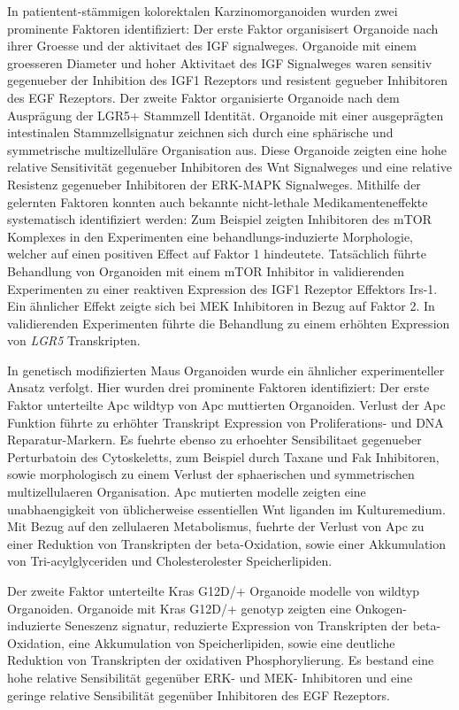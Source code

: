 In patientent-stämmigen kolorektalen Karzinomorganoiden wurden zwei prominente Faktoren identifiziert: Der erste Faktor organisisert Organoide nach ihrer Groesse und der aktivitaet des IGF signalweges. Organoide mit einem groesseren Diameter und hoher Aktivitaet des IGF Signalweges waren sensitiv gegenueber der Inhibition des IGF1 Rezeptors und resistent gegueber Inhibitoren des EGF Rezeptors. 
\smallbreak
Der zweite Faktor organisierte Organoide nach dem Ausprägung der LGR5+ Stammzell Identität. Organoide mit einer ausgeprägten intestinalen Stammzellsignatur zeichnen sich durch eine sphärische und symmetrische multizelluläre Organisation aus. Diese Organoide zeigten eine hohe relative Sensitivität gegenueber Inhibitoren des Wnt Signalweges und eine relative Resistenz gegenueber Inhibitoren der ERK-MAPK Signalweges. 
\smallbreak
Mithilfe der gelernten Faktoren konnten auch bekannte nicht-lethale Medikamenteneffekte systematisch identifiziert werden: Zum Beispiel zeigten Inhibitoren des mTOR Komplexes in den Experimenten eine behandlungs-induzierte Morphologie, welcher auf einen positiven Effect auf Faktor 1 hindeutete. Tatsächlich führte Behandlung von Organoiden mit einem mTOR Inhibitor in validierenden Experimenten zu einer reaktiven Expression des IGF1 Rezeptor Effektors Irs-1. Ein ähnlicher Effekt zeigte sich bei MEK Inhibitoren in Bezug auf Faktor 2. In validierenden Experimenten führte die Behandlung zu einem erhöhten Expression von \textit{LGR5} Transkripten.
\bigbreak

In genetisch modifizierten Maus Organoiden wurde ein ähnlicher experimenteller Ansatz verfolgt. Hier wurden drei prominente Faktoren identifiziert: Der erste Faktor unterteilte Apc wildtyp von Apc muttierten Organoiden. Verlust der Apc Funktion führte zu erhöhter Transkript Expression von Proliferations- und DNA Reparatur-Markern. Es fuehrte ebenso zu erhoehter Sensibilitaet gegenueber Perturbatoin des Cytoskeletts, zum Beispiel durch Taxane und Fak Inhibitoren, sowie morphologisch zu einem Verlust der sphaerischen und symmetrischen multizellulaeren Organisation. Apc mutierten modelle zeigten eine unabhaengigkeit von üblicherweise essentiellen Wnt liganden im Kulturemedium. Mit Bezug auf den zellulaeren Metabolismus, fuehrte der Verlust von Apc zu einer Reduktion von Transkripten der beta-Oxidation, sowie einer Akkumulation von Tri-acylglyceriden und Cholesterolester Speicherlipiden.
\bigbreak

Der zweite Faktor unterteilte Kras G12D/+ Organoide modelle von wildtyp Organoiden. Organoide mit Kras G12D/+ genotyp zeigten eine Onkogen-induzierte Seneszenz signatur, reduzierte  Expression von Transkripten der beta-Oxidation, eine Akkumulation von Speicherlipiden, sowie eine deutliche Reduktion von Transkripten der oxidativen Phosphorylierung. Es bestand eine hohe relative Sensibilität gegenüber ERK- und MEK- Inhibitoren und eine geringe relative Sensibilität gegenüber Inhibitoren des EGF Rezeptors. 
\bigbreak

